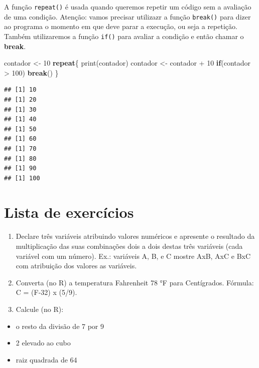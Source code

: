 \documentclass[
]{book}
\newenvironment{Shaded}{\begin{snugshade}}{\end{snugshade}}
\newcommand{\ControlFlowTok}[1]{\textcolor[rgb]{0.13,0.29,0.53}{\textbf{#1}}}
\newcommand{\DecValTok}[1]{\textcolor[rgb]{0.00,0.00,0.81}{#1}}
\newcommand{\FunctionTok}[1]{\textcolor[rgb]{0.00,0.00,0.00}{#1}}
\newcommand{\NormalTok}[1]{#1}
\newcommand{\OtherTok}[1]{\textcolor[rgb]{0.56,0.35,0.01}{#1}}
\newcommand{\SpecialCharTok}[1]{\textcolor[rgb]{0.00,0.00,0.00}{#1}}
\providecommand{\tightlist}{%
  \setlength{\itemsep}{0pt}\setlength{\parskip}{0pt}}
\theoremstyle{definition}
\theoremstyle{definition}
\theoremstyle{definition}
\theoremstyle{definition}
\theoremstyle{remark}
\begin{document}
A função \texttt{repeat()} é usada quando queremos repetir um código sem a avaliação de uma condição. Atenção: vamos precisar utilizazr a função \texttt{break()} para dizer ao programa o momento em que deve parar a execução, ou seja a repetição. Também utilizaremos a função \texttt{if()} para avaliar a condição e então chamar o \textbf{break}.

\begin{Shaded}
\begin{Highlighting}[]
\NormalTok{contador }\OtherTok{\textless{}{-}} \DecValTok{10}
\ControlFlowTok{repeat}\NormalTok{\{}
  \FunctionTok{print}\NormalTok{(contador)}
\NormalTok{  contador }\OtherTok{\textless{}{-}}\NormalTok{ contador }\SpecialCharTok{+} \DecValTok{10}
  \ControlFlowTok{if}\NormalTok{(contador }\SpecialCharTok{\textgreater{}} \DecValTok{100}\NormalTok{) }\ControlFlowTok{break}\NormalTok{()}
\NormalTok{\}}
\end{Highlighting}
\end{Shaded}

\begin{verbatim}
## [1] 10
## [1] 20
## [1] 30
## [1] 40
## [1] 50
## [1] 60
## [1] 70
## [1] 80
## [1] 90
## [1] 100
\end{verbatim}

\hypertarget{lista-de-exercuxedcios}{%
\section{Lista de exercícios}\label{lista-de-exercuxedcios}}

\begin{enumerate}
\def\labelenumi{\arabic{enumi}.}
\item
  Declare três variáveis atribuindo valores numéricos e apresente o resultado da multiplicação das suas combinações dois a dois destas três variáveis (cada variável com um número). Ex.: variáveis A, B, e C mostre AxB, AxC e BxC com atribuição dos valores as variáveis.
\item
  Converta (no R) a temperatura Fahrenheit 78 °F para Centígrados. Fórmula: C = (F-32) x (5/9).
\item
  Calcule (no R):
\end{enumerate}

\begin{itemize}
\tightlist
\item
  o resto da divisão de 7 por 9
\item
  2 elevado ao cubo
\item
  raiz quadrada de 64
\end{itemize}
\end{document}
